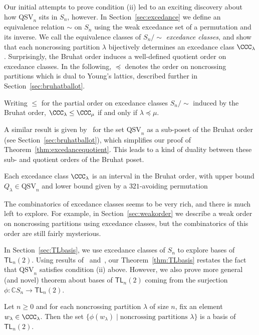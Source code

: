 \documentclass[12pt]{amsart}
\theoremstyle{definition}
\theoremstyle{remark}
\numberwithin{equation}{section}
\newenvironment{introthm}[1]{
  \renewcommand\theequation{#1}
  \thm
}{\endthm}
\newenvironment{introcor}[1]{
  \renewcommand\theequation{#1}
  \cor
}{\endcor}
\newcommand{\CC}{\mathbb{C}}
\newcommand{\TL}{\mathsf{TL}}
\newcommand{\QSV}{\mathrm{QSV}}
\begin{document}
Our initial attempts to prove condition (ii) led to an exciting discovery about how $\QSV_{n}$ sits in $S_{n}$, however.  
In Section~\ref{sec:excedance} we define an equivalence relation $\sim$ on $S_{n}$ using the weak excedance set of a permutation and its inverse.  
We call the equivalence classes of $S_{n}/\!\!\sim$ \emph{excedance classes}, and show that each noncrossing partition $\lambda$ bijectively determines an excedance class $\CCC_{\lambda}$.  
Surprisingly, the Bruhat order induces a well-defined quotient order on excedance classes.  
In the following, $\preceq$ denotes the order on noncrossing partitions which is dual to Young's lattics, described further in Section~\ref{sec:bruhatballot}.

\begin{introthm}{\ref{thm:excedancequotient}}
Writing $\le$ for the partial order on excedance classes $S_{n}/\!\! \sim$ induced by the Bruhat order, $\CCC_{\lambda} \le \CCC_{\mu}$ if and only if $\lambda \preceq \mu$.
\end{introthm}

A similar result is given by~\cite{GobetWilliams} for the set $\QSV_{n}$ as a sub-poset of the Bruhat order (see Section~\ref{sec:bruhatballot}), which simplifies our proof of Theorem~\ref{thm:excedancequotient}.  This leads to a kind of duality between these sub- and quotient orders of the Bruhat poset.

\begin{introcor}{\ref{cor:interval}}
Each excedance class $\CCC_{\lambda}$ is an interval in the Bruhat order, with upper bound $Q_{\lambda}\in \QSV_n$ and lower bound given by a $321$-avoiding permutation
\end{introcor}

The combinatorics of excedance classes seems to be very rich, and there is much left to explore.   
For example, in Section~\ref{sec:weakorder} we describe a weak order on noncrossing partitions using excedance classes, but the combinatorics of this order are still fairly mysterious.  

In Section~\ref{sec:TLbasis}, we use excedance classes of $S_{n}$ to explore bases of $\TL_{n}(2)$.  Using results of~\cite{GobetWilliams} and~\cite{Zinno}, our Theorem~\ref{thm:TLbasis} restates the fact that $\QSV_{n}$ satisfies condition (ii) above.  However, we also prove more general (and novel) theorem about bases of $\TL_{n}(2)$ coming from the surjection $\phi: \CC S_{n} \to \TL_{n}(2)$.

\begin{introthm}{\ref{thm:TLbases}}
Let $n \ge 0$ and for each noncrossing partition $\lambda$ of size $n$, fix an element $w_{\lambda} \in \CCC_{\lambda}$. Then the set $\{\phi(w_{\lambda}) \;|\; \text{noncrossing partitions $\lambda$}\}$ is a basis of $\TL_{n}(2)$.
\end{introthm}
\end{document}

